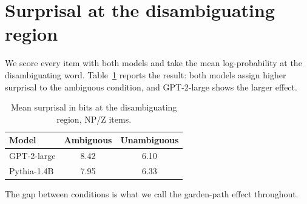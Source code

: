 \documentclass[11pt]{article}
\begin{document}
\section{Surprisal at the disambiguating region}

We score every item with both models and take the mean log-probability at the
disambiguating word. Table~\ref{tab:surprisal} reports the result: both models
assign higher surprisal to the ambiguous condition, and GPT-2-large shows the
larger effect.

\begin{table}[t]
\centering
\begin{tabular}{lcc}
\toprule
Model & Ambiguous & Unambiguous \\
\midrule
GPT-2-large & 8.42 & 6.10 \\
Pythia-1.4B & 7.95 & 6.33 \\
\bottomrule
\end{tabular}
\caption{Mean surprisal in bits at the disambiguating region, NP/Z items.}
\label{tab:surprisal}
\end{table}

The gap between conditions is what we call the garden-path effect throughout.
\end{document}
